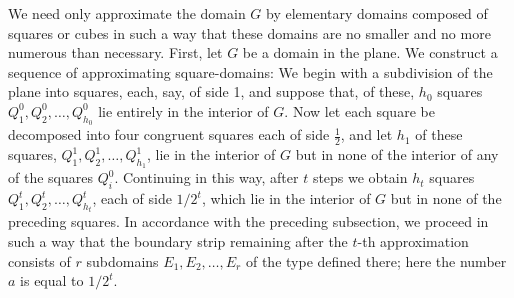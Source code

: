 We need only approximate the domain $G$ by elementary domains composed of squares or cubes in such a way that these domains are no smaller and no more numerous than necessary. First, let $G$ be a domain in the plane. We construct a sequence of approximating square-domains: We begin with a subdivision of the plane into squares, each, say, of side 1, and suppose that, of these, $h_0$ squares $Q_1^0,Q_2^0,\ldots,Q_{h_0}^0$ lie entirely in the interior of $G$. Now let each square be decomposed into four congruent squares each of side $\tfrac12$, and let $h_1$ of these squares, $Q_1^1,Q_2^1,\ldots,Q_{h_1}^1$, lie in the interior of $G$ but in none of the interior of any of the squares $Q_i^0$. Continuing in this way, after $t$ steps we obtain $h_t$ squares $Q_1^t,Q_2^t,\ldots,Q_{h_t}^t$, each of side $1/2^t$, which lie in the interior of $G$ but in none of the preceding squares. In accordance with the preceding subsection, we proceed in such a way that the boundary strip remaining after the $t$-th approximation consists of $r$ subdomains $E_1,E_2,\ldots,E_r$ of the type defined there; here the number $a$ is equal to $1/2^t$.

